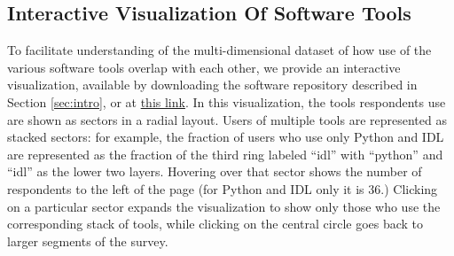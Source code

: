 \subsection{Interactive Visualization Of Software Tools}
\label{ssec:d3viz}

To facilitate understanding of the multi-dimensional dataset of how use of the various software tools overlap with each other, we provide an interactive visualization, available by downloading the software repository described in Section \ref{sec:intro}, or at \href{http://eteq.github.io/software_survey_analysis/software_tools_heirarchy_d3vis.html}{this link}. In this visualization, the tools respondents use are shown as sectors in a radial layout.  Users of multiple tools are represented as stacked sectors: for example, the fraction of users who use only Python and IDL are represented as the fraction of the third ring labeled ``idl'' with ``python'' and ``idl'' as the lower two layers.  Hovering over that sector shows the number of respondents to the left of the page (for Python and IDL only it is 36.)  Clicking on a particular sector expands the visualization to show only those who use the corresponding stack of tools, while clicking on the central circle goes back to larger segments of the survey.